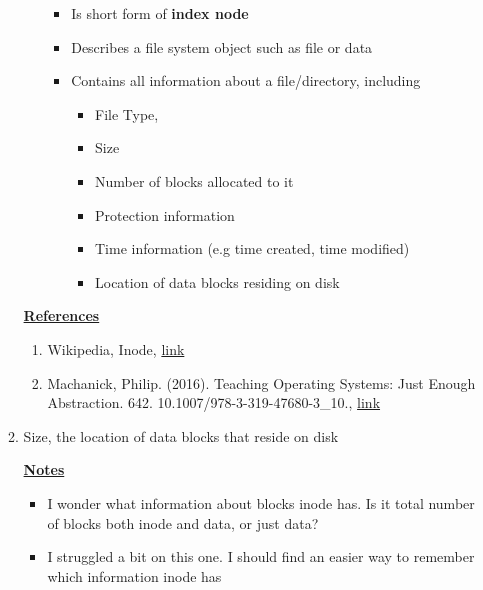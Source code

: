 \documentclass[12pt]{article}
\begin{document}
\begin{enumerate}[1.]
\begin{enumerate}
\begin{itemize}
            \begin{itemize}
                \item Is short form of \textbf{index node}
                \item Describes a file system object such as file or data
                \item Contains all information about a file/directory, including
                \begin{itemize}
                    \item File Type,
                    \item Size
                    \item Number of blocks allocated to it
                    \item Protection information
                    \item Time information (e.g time created, time modified)
                    \item Location of data blocks residing on disk
                \end{itemize}

            \end{itemize}
        \end{itemize}

        \bigskip

        \underline{\textbf{References}}

        \begin{enumerate}[1)]
            \item Wikipedia, Inode, \href{https://en.wikipedia.org/wiki/Inode}{link}
            \item Machanick, Philip. (2016). Teaching Operating Systems: Just Enough Abstraction. 642. 10.1007/978-3-319-47680-3\_10., \href{https://www.researchgate.net/figure/Conceptual-index-node-inode-The-top-level-block-contains-file-attributes-12-direct_fig1_306347325}{link}
        \end{enumerate}

        \item

        Size, the location of data blocks that reside on disk

        \bigskip

        \underline{\textbf{Notes}}

        \begin{itemize}
            \item I wonder what information about blocks inode has. Is it total number
            of blocks both inode and data, or just data?
            \item I struggled a bit on this one. I should find an easier way to
            remember which information inode has
        \end{itemize}


\end{enumerate}
\end{enumerate}
\end{document}
